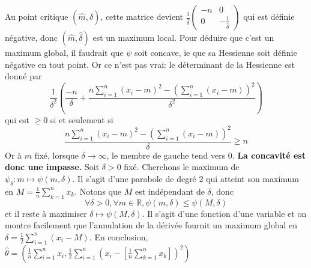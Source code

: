 \documentclass{report}
\begin{document}
Au point critique $(\hat m, \hat \delta)$, cette matrice devient $\frac{1}{\hat \delta} \begin{pmatrix}
-n & 0 \\
0 & -\frac{1}{\hat \delta}
\end{pmatrix}$ qui est définie négative, donc $(\hat m, \hat \delta)$ est un maximum local. \newline
Pour déduire que c'est un maximum global, il faudrait que $\psi$ soit concave, ie que sa Hessienne soit définie négative en tout point. Or ce n'est pas vrai: le déterminant de la Hessienne est donné par $$\frac{1}{\delta^2}\left(\frac{-n}{\delta} + \frac{n \sum_{i=1}^n (x_i-m)^2 - \left(\sum_{i=1}^n(x_i-m) \right)^2}{\delta^2}\right)$$ qui est $\geq 0$ si et seulement si $$\frac{n \sum_{i=1}^n (x_i-m)^2 - \left(\sum_{i=1}^n(x_i-m) \right)^2}{\delta}\geq n$$
Or à $m$ fixé, lorsque $\delta \to \infty$, le membre de gauche tend vers $0$.\newline
\textbf{La concavité est donc une impasse.}\newline \newline 
Soit $\delta >0$ fixé. Cherchons le maximum de $\psi_\delta: m\mapsto \psi(m,\delta)$. Il s'agit d'une parabole de degré $2$ qui atteint son maximum en $M = \frac{1}{n}\sum_{k=1}^n x_k$. Notons que $M$ est indépendant de $\delta$, donc $$\forall \delta >0, \forall m\in \mathbb R, \psi(m,\delta)\leq \psi(M,\delta)$$
et il reste à maximiser $\delta \mapsto \psi(M,\delta)$. Il s'agit d'une fonction d'une variable et on montre facilement que l'annulation de la dérivée fournit un maximum global en $\delta = \frac 12 \sum_{i=1}^n (x_i - M)$.\newline
En conclusion, $\hat \theta  = (\frac{1}{n}\sum_{i=1}^n x_i, \frac{1}{2}\sum_{i=1}^n \left(x_i - \left[\frac{1}{n}\sum_{k=1}^n x_k \right]\right)^2)$
\end{document}
